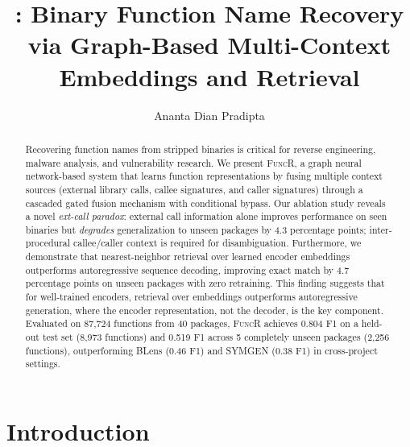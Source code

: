 \documentclass[sigconf,nonacm]{acmart}
\newcommand{\sysname}{\textsc{FuncR}}
\begin{document}
\title{{\normalfont{\sysname{}}}: Binary Function Name Recovery via Graph-Based Multi-Context Embeddings and Retrieval}

\author{Ananta Dian Pradipta}


\begin{abstract}
Recovering function names from stripped binaries is critical for reverse engineering, malware analysis, and vulnerability research. We present \sysname{}, a graph neural network-based system that learns function representations by fusing multiple context sources (external library calls, callee signatures, and caller signatures) through a cascaded gated fusion mechanism with conditional bypass. Our ablation study reveals a novel \emph{ext-call paradox}: external call information alone improves performance on seen binaries but \emph{degrades} generalization to unseen packages by 4.3 percentage points; inter-procedural callee/caller context is required for disambiguation. Furthermore, we demonstrate that nearest-neighbor retrieval over learned encoder embeddings outperforms autoregressive sequence decoding, improving exact match by 4.7 percentage points on unseen packages with zero retraining. This finding suggests that for well-trained encoders, retrieval over embeddings outperforms autoregressive generation, where the encoder representation, not the decoder, is the key component. Evaluated on 87,724 functions from 40 packages, \sysname{} achieves 0.804 F1 on a held-out test set (8,973 functions) and 0.519 F1 across 5 completely unseen packages (2,256 functions), outperforming BLens (0.46 F1) and SYMGEN (0.38 F1) in cross-project settings.
\end{abstract}


\maketitle
\hypersetup{colorlinks=true,linkcolor=blue,citecolor=blue,urlcolor=blue}

\section{Introduction}
\label{sec:intro}
\end{document}
